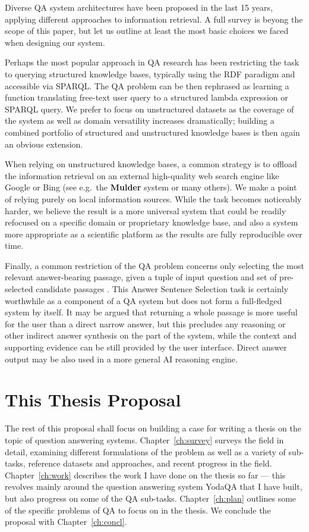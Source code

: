 Diverse QA system architectures have been proposed in the last 15 years,
applying different approaches to information retrieval.  A full survey
is beyong the scope of this paper, but let us outline at least the most
basic choices we faced when designing our system.

Perhaps the most popular approach in QA research has been restricting
the task to querying structured knowledge bases, typically using the
RDF paradigm and accessible via SPARQL\@.  The QA problem can
be then rephrased as learning a function translating free-text user query
to a structured lambda expression or SPARQL query. \cite{Semantic2013Berant} \cite{Semantic2014Bordes}
We prefer to focus on unstructured datasets as the coverage of the system
as well as domain versatility increases dramatically; building a combined
portfolio of structured and unstructured knowledge bases
is then again an obvious extension.

When relying on unstructured knowledge bases, a common strategy is to offload
the information retrieval on an external high-quality web search engine
like Google or Bing (see e.g.\ the \textbf{Mulder} system \cite{MulderKwok}
or many others).
We make a point of relying purely on local information sources.
While the task becomes noticeably harder,
we believe the result is a more
universal system that could be readily refocused on a specific domain
or proprietary knowledge base, and also a system more appropriate as
a scientific platform as the results are fully reproducible over time.

Finally, a common restriction of the QA problem concerns only selecting
the most relevant answer-bearing passage, given a tuple of input question
and set of pre-selected candidate passages \cite{WangQAGrammar}.
This Answer Sentence Selection task is certainly
worthwhile as a component of a QA system but does not form a full-fledged
system by itself.
It may be argued that returning a whole passage is more useful for the user than a direct narrow answer,
but this precludes any reasoning or other indirect answer synthesis on the part of the system,
while the context and supporting evidence can be still provided by the user interface.
Direct answer output may be also used in a more general AI reasoning engine.

\section{This Thesis Proposal}

The rest of this proposal shall focus on building a case for writing
a thesis on the topic of question answering systems.
Chapter~\ref{ch:survey}
surveys the field in detail, examining different formulations of the problem
as well as a variety of sub-tasks, reference datasets and approaches,
and recent progress in the field.
Chapter~\ref{ch:work} describes
the work I have done on the thesis so far --- this revolves mainly around
the question answering system YodaQA that I have built, but also progress
on some of the QA sub-tasks.
Chapter~\ref{ch:plan} outlines some of the specific problems of QA
to focus on in the thesis.
We conclude the proposal with Chapter~\ref{ch:concl}.
